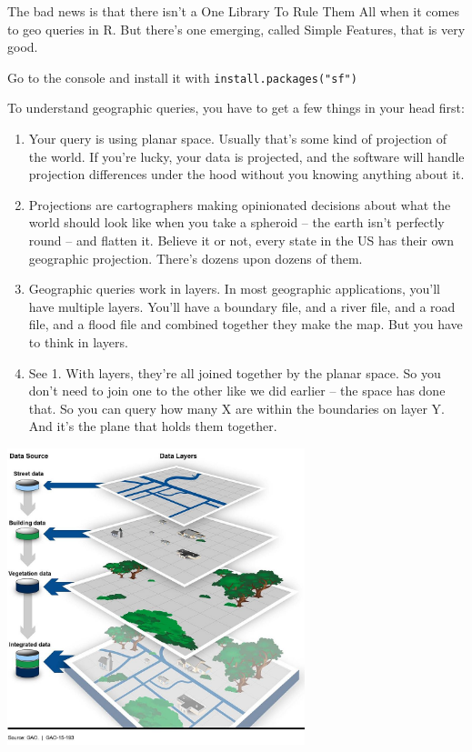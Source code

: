 \documentclass[
  letterpaper,
  DIV=11,
  numbers=noendperiod]{scrreprt}
\providecommand{\tightlist}{%
  \setlength{\itemsep}{0pt}\setlength{\parskip}{0pt}}\usepackage{longtable,booktabs,array}
\begin{document}
The bad news is that there isn't a One Library To Rule Them All when it
comes to geo queries in R. But there's one emerging, called Simple
Features, that is very good.

Go to the console and install it with \texttt{install.packages("sf")}

To understand geographic queries, you have to get a few things in your
head first:

\begin{enumerate}
\def\labelenumi{\arabic{enumi}.}
\tightlist
\item
  Your query is using planar space. Usually that's some kind of
  projection of the world. If you're lucky, your data is projected, and
  the software will handle projection differences under the hood without
  you knowing anything about it.
\item
  Projections are cartographers making opinionated decisions about what
  the world should look like when you take a spheroid -- the earth isn't
  perfectly round -- and flatten it. Believe it or not, every state in
  the US has their own geographic projection. There's dozens upon dozens
  of them.
\item
  Geographic queries work in layers. In most geographic applications,
  you'll have multiple layers. You'll have a boundary file, and a river
  file, and a road file, and a flood file and combined together they
  make the map. But you have to think in layers.
\item
  See 1. With layers, they're all joined together by the planar space.
  So you don't need to join one to the other like we did earlier -- the
  space has done that. So you can query how many X are within the
  boundaries on layer Y. And it's the plane that holds them together.
\end{enumerate}

\includegraphics[width=3.41in,height=\textheight]{./images/geolayers.jpg}
\end{document}
